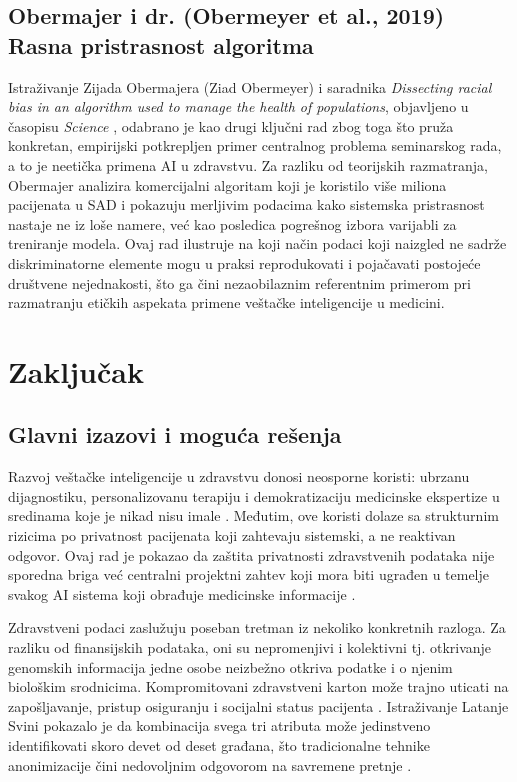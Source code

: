 \documentclass[12pt]{article}
\begin{document}
\subsection{Obermajer i dr. (Obermeyer et al., 2019) Rasna pristrasnost algoritma}
 
Istraživanje Zijada Obermajera (Ziad Obermeyer) i saradnika \textit{Dissecting racial bias in an algorithm used to manage the health of populations}, objavljeno u časopisu \textit{Science} \cite{obermeyer2019}, odabrano je kao drugi ključni rad zbog toga što pruža konkretan, empirijski potkrepljen primer centralnog problema seminarskog rada, a to je neetička primena AI u zdravstvu. Za razliku od teorijskih razmatranja, Obermajer analizira komercijalni algoritam koji je koristilo više miliona pacijenata u SAD i pokazuju merljivim podacima kako sistemska pristrasnost nastaje ne iz loše namere, već kao posledica pogrešnog izbora varijabli za treniranje modela. Ovaj rad ilustruje na koji način podaci koji naizgled ne sadrže diskriminatorne elemente mogu u praksi reprodukovati i pojačavati postojeće društvene nejednakosti, što ga čini nezaobilaznim referentnim primerom pri razmatranju etičkih aspekata primene veštačke inteligencije u medicini.
 
\newpage
\section{Zaključak}
\subsection{Glavni izazovi i moguća rešenja}
Razvoj veštačke inteligencije u zdravstvu donosi neosporne koristi: ubrzanu dijagnostiku, personalizovanu terapiju i demokratizaciju medicinske ekspertize u sredinama koje je nikad nisu imale \cite{topol2019}. Međutim, ove koristi dolaze sa strukturnim rizicima po privatnost pacijenata koji zahtevaju sistemski, a ne reaktivan odgovor. Ovaj rad je pokazao da zaštita privatnosti zdravstvenih podataka nije sporedna briga već centralni projektni zahtev koji mora biti ugrađen u temelje svakog AI sistema koji obrađuje medicinske informacije \cite{murdoch2021}.
 
Zdravstveni podaci zaslužuju poseban tretman iz nekoliko konkretnih razloga. Za razliku od finansijskih podataka, oni su nepromenjivi i kolektivni tj. otkrivanje genomskih informacija jedne osobe neizbežno otkriva podatke i o njenim biološkim srodnicima. Kompromitovani zdravstveni karton može trajno uticati na zapošljavanje, pristup osiguranju i socijalni status pacijenta \cite{abouelmehdi2017}. Istraživanje Latanje Svini pokazalo je da kombinacija svega tri atributa može jedinstveno identifikovati skoro devet od deset građana, što tradicionalne tehnike anonimizacije čini nedovoljnim odgovorom na savremene pretnje \cite{sweeney2000}.
 
\end{document}
